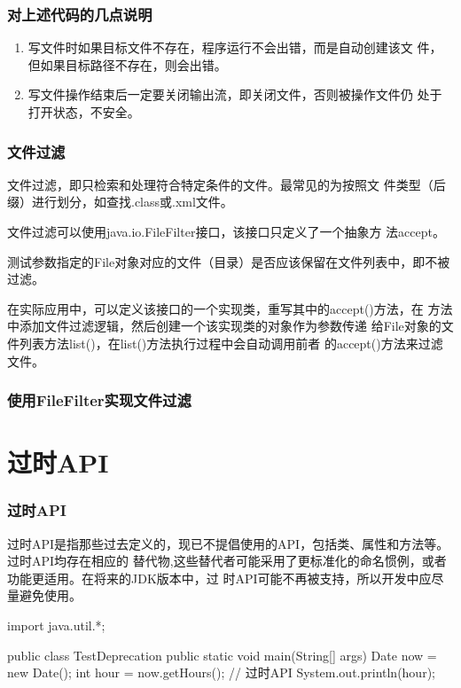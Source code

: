 \begin{frame}[fragile] %
  \frametitle{对上述代码的几点说明}

  \begin{enumerate}
  \item 写文件时如果目标文件不存在，程序运行不会出错，而是自动创建该文
    件，但如果目标路径不存在，则会出错。
  \item 写文件操作结束后一定要关闭输出流，即关闭文件，否则被操作文件仍
    处于打开状态，不安全。
  \end{enumerate}
\end{frame}

\begin{frame}[fragile] %
  \frametitle{文件过滤}

  \begin{block}{}
    文件过滤，即只检索和处理符合特定条件的文件。{\kai 最常见的为按照文
      件类型（后缀）进行划分，如查找.class或.xml文件。}

    文件过滤可以使用java.io.FileFilter接口，该接口只定义了一个抽象方
    法accept。
  \end{block}


  测试参数指定的File对象对应的文件（目录）是否应该保留在文件列表中，即不被过滤。

  {\kai 在实际应用中，可以定义该接口的一个实现类，重写其中的accept()方法，在
  方法中添加文件过滤逻辑，然后创建一个该实现类的对象作为参数传递
  给File对象的文件列表方法list()，在list()方法执行过程中会自动调用前者
  的accept()方法来过滤文件。}
  
\end{frame}

\begin{frame}[fragile] %
  \frametitle{使用FileFilter实现文件过滤}

  
\end{frame}


\section{过时API}
\begin{frame}[fragile] %
  \frametitle{过时API}

  过时API是指那些过去定义的，现已不提倡使用的API，包括类、属性和方法等。过时API均存在相应的
  替代物,这些替代者可能采用了更标准化的命名惯例，或者功能更适用。在将来的JDK版本中，过
  时API可能不再被支持，所以开发中应尽量避免使用。

  \begin{javaCode}
    import java.util.*;

    public class TestDeprecation {
      public static void main(String[] args) {
        Date now = new Date();
        int hour = now.getHours(); // 过时API
        System.out.println(hour);
      } 
    }
  \end{javaCode}


\end{frame}

